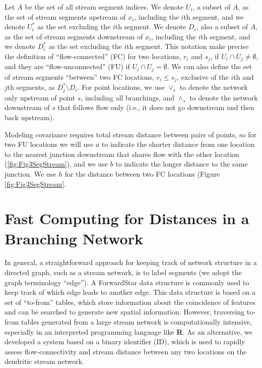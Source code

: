 \documentclass[]{book}
\theoremstyle{definition}
\theoremstyle{definition}
\theoremstyle{definition}
\theoremstyle{remark}
\begin{document}
Let \(A\) be the set of all stream segment indices. We denote \(U_{i}\),
a subset of \(A\), as the set of stream segments upstream of \(x_i\),
including the \(i\)th segment, and we denote \(U^{*}_{i}\) as the set
excluding the \(i\)th segment. We denote \(D_{i}\), also a subset of
\(A\), as the set of stream segments downstream of \(x_i\), including
the \(i\)th segment, and we denote \(D^{*}_{i}\) as the set excluding
the \(i\)th segment. This notation make precise the definition of
``flow-connected'' (FC) for two locations, \(r_i\) and \(s_j\), if
\(U_i \cap U_j \neq \emptyset\), and they are ``flow-unconnected'' (FU)
if \(U_i \cap U_j = \emptyset\). We can also define the set of stream
segments ``between'' two FC locations, \(r_i \leq s_j\), exclusive of
the \(i\)th and \(j\)th segments, as \(D^{*}_{j} \setminus D_i\). For
point locations, we use \(\vee_s\) to denote the network only upstream
of point \(s\), including all branchings, and \(\wedge_s\) to denote the
network downstream of \(s\) that follows flow only (i.e., it does not go
downstream and then back upstream).

Modeling covariance requires total stream distance between pairs of
points, so for two FU locations we will use \(a\) to indicate the
shorter distance from one location to the nearest junction downstream
that shares flow with the other location (\ref{fig:Fig3SegStream}), and
we use \(b\) to indicate the longer distance to the same junction. We
use \(h\) for the distance between two FC locations (Figure
\ref{fig:Fig3SegStream}.

\hypertarget{fast-computing-for-distances-in-a-branching-network}{%
\section{Fast Computing for Distances in a Branching
Network}\label{fast-computing-for-distances-in-a-branching-network}}

In general, a straightforward approach for keeping track of network
structure in a directed graph, such as a stream network, is to label
segments (we adopt the graph terminology ``edge''). A ForwardStar data
structure \citep{Ahuj:Magn:Orli:netw:1993} is commonly used to keep
track of which edge leads to another edge. This data structure is based
on a set of ``to-from'' tables, which store information about the
coincidence of features and can be searched to generate new spatial
information. However, traversing to-from tables generated from a large
stream network is computationally intensive, especially in an
interpreted programming language like \textbf{R}. As an alternative, we
developed a system based on a binary identifier (ID), which is used to
rapidly assess flow-connectivity and stream distance between any two
locations on the dendritic stream network.
\end{document}
